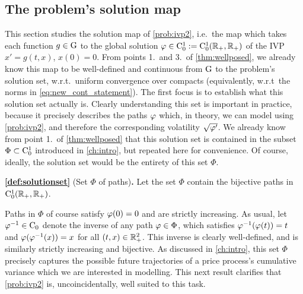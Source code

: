 \subsection{The problem's solution map}\label{sec:solution_space}

This section studies the solution map of \autoref{prob:ivp2}, i.e.~the map which takes each function $g\in\mathrm{G}$ to the global solution $\varphi\in\mathrm{C}^1_0:=\mathrm{C}^1_0(\mathbb{R}_+,\mathbb{R}_+)$ of the IVP $x'=g(t,x)$, $x(0)=0$. From points 1.~and 3.~of \autoref{thm:wellposed}, we already know this map to be well-defined and continuous from $\mathrm{G}$ to the problem's solution set, w.r.t.~uniform convergence over compacts (equivalently, w.r.t~the norms in \autoref{eq:new_cont_statement}). The first focus is to establish what this solution set actually is. Clearly understanding this set is important in practice, because it precisely describes the paths $\varphi$ which, in theory, we can model using \autoref{prob:ivp2}, and therefore the corresponding volatility $\sqrt{\varphi'}$. We already know from point 1.~of \autoref{thm:wellposed} that this solution set is contained in the subset $\Phi\subset\mathrm{C}^1_0$ introduced in \autoref{ch:intro}, but repeated here for convenience. Of course, ideally, the solution set would be the entirety of this set $\Phi$.

\textbf{\autoref{def:solutionset}} (Set $\Phi$ of paths)\textbf{.}
    Let the set $\Phi$ contain the bijective paths in $\mathrm{C}^1_0(\mathbb{R}_+,\mathbb{R}_+)$.

Paths in $\Phi$ of course satisfy $\varphi(0)=0$ and are strictly increasing. As usual, let $\varphi^{-1}\in\mathrm{C}_0$ denote the inverse of any path $\varphi\in\Phi$, which satisfies $\varphi^{-1}(\varphi(t))=t$ and $\varphi(\varphi^{-1}(x))=x$ for all $(t,x)\in\mathbb{R}_+^2$. This inverse is clearly well-defined, and is similarly strictly increasing and bijective. As discussed in \autoref{ch:intro}, this set $\Phi$ precisely captures the possible future trajectories of a price process's cumulative variance which we are interested in modelling. This next result clarifies that \autoref{prob:ivp2} is, uncoincidentally, well suited to this task.

